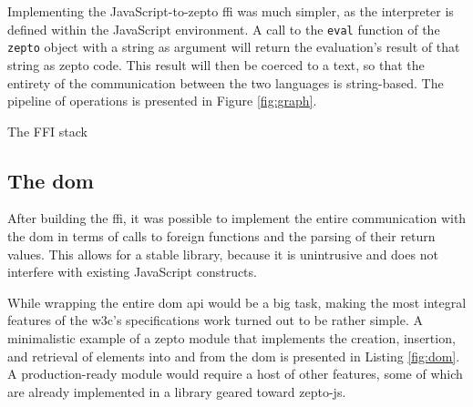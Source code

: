 \documentclass[oneside,11pt,xetex]{scrbook}
\begin{document}
Implementing the JavaScript-to-zepto \gls{ffi} was much simpler, as the
interpreter is defined within the JavaScript environment. A call to the
\texttt{eval} function of the \texttt{zepto} object with a string as argument
will return the evaluation's result of that string as zepto code. This result
will then be coerced to a text, so that the entirety of the communication between
the two languages is string-based. The pipeline of operations is presented
in Figure \ref{fig:graph}.

\begin{listing}[H]
\caption{The FFI stack}
\label{fig:graph}
\end{listing}

\subsection{The \gls{dom}}
\label{sec:DOM}

After building the \gls{ffi}, it was possible to implement the entire
communication with the \gls{dom} in terms of calls to foreign functions
and the parsing of their return values. This allows for a stable library,
because it is unintrusive and does not interfere with existing JavaScript
constructs.

While wrapping the entire \gls{dom} \gls{api} would be a big task, making
the most integral features of the \gls{w3c}'s specifications work turned
out to be rather simple. A minimalistic example of a zepto module
that implements the creation, insertion, and retrieval of elements into
and from the \gls{dom} is presented in Listing \ref{fig:dom}. A production-ready
module would require a host of other features, some of which are already
implemented in a library geared toward zepto-js.
\end{document}
